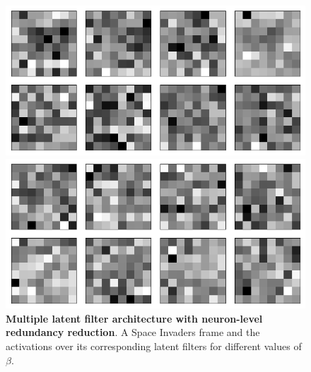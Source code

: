 \begin{figure}[h!]
\begin{minipage}{0.55\textwidth}
\caption{$\beta = 1$}
\includegraphics[scale=0.42]{figures/results/indiscriminate_decoupling/beta_4_convolutional_layers_sample_3.png}
\caption{$\beta = 4$}
\includegraphics[scale=0.42]{figures/results/indiscriminate_decoupling/beta_32_convolutional_layers_sample_3.png}
\caption{$\beta = 32$}
\end{minipage}
\caption{\textbf{Multiple latent filter architecture with neuron-level redundancy reduction}. A Space Invaders frame and the activations over its corresponding latent filters for different values of $\beta$.}
\label{fig:indiscriminate_decoupling_originals_and_latent_filters}
\end{figure}


